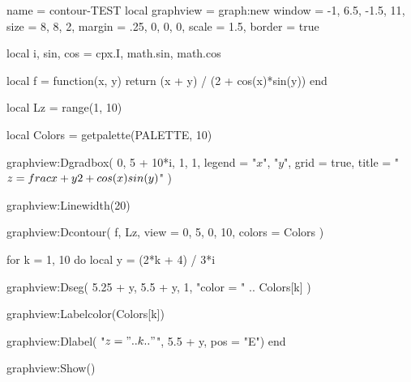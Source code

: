  \begin{luadraw}{name = contour-TEST}
 local graphview = graph:new{
   window = {-1, 6.5, -1.5, 11},
   size   = {8, 8, 2},
   margin = {.25, 0, 0, 0},
   scale  = 1.5,
   border = true
 }

 local i, sin, cos = cpx.I, math.sin, math.cos

 local f = function(x, y) return (x + y) / (2 + cos(x)*sin(y)) end

 local Lz = range(1, 10)

 local Colors = getpalette(PALETTE, 10)

 graphview:Dgradbox(
   {0, 5 + 10*i, 1, 1},
   {
     legend = {"$x$", "$y$"},
     grid   = true,
     title  = "$z = \\frac{x + y}{2 + \\cos(x) \\sin(y)}$"
   })

 graphview:Linewidth(20)

 graphview:Dcontour(
   f,
   Lz,
   {
     view   = {0, 5, 0, 10},
     colors = Colors
   })

 for k = 1, 10 do
   local y = (2*k + 4) / 3*i

   graphview:Dseg(
     {5.25 + y, 5.5 + y},
     1,
     "color = " .. Colors[k]
   )

   graphview:Labelcolor(Colors[k])

   graphview:Dlabel(
     "$z = " .. k .. "$",
     5.5 + y,
     {pos = "E"})
 end

 graphview:Show()
 \end{luadraw}


 \bigskip



